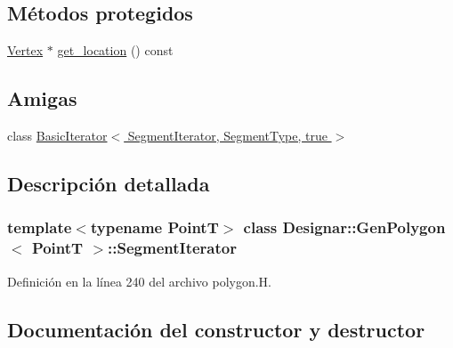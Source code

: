 \subsection*{Métodos protegidos}
\begin{DoxyCompactItemize}
\item 
\hyperlink{class_designar_1_1_d_l_node}{Vertex} $\ast$ \hyperlink{class_designar_1_1_gen_polygon_1_1_segment_iterator_aa9bf75b7e9feef819ad97f7acd152fe6}{get\+\_\+location} () const
\end{DoxyCompactItemize}
\subsection*{Amigas}
\begin{DoxyCompactItemize}
\item 
class \hyperlink{class_designar_1_1_gen_polygon_1_1_segment_iterator_a54b9d6098f6dc7d5411a81dccef33d89}{Basic\+Iterator$<$ Segment\+Iterator, Segment\+Type, true $>$}
\end{DoxyCompactItemize}


\subsection{Descripción detallada}
\subsubsection*{template$<$typename PointT$>$\newline
class Designar\+::\+Gen\+Polygon$<$ Point\+T $>$\+::\+Segment\+Iterator}



Definición en la línea 240 del archivo polygon.\+H.



\subsection{Documentación del constructor y destructor}
\mbox{\label{class_designar_1_1_gen_polygon_1_1_segment_iterator_a80756e8c1b97f3f92ec2096de23ffbc8}} 
